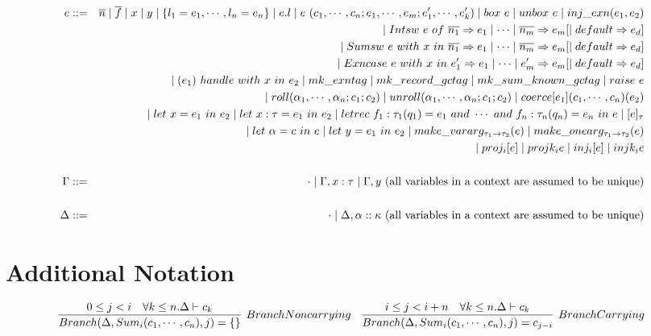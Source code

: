 \documentclass{article}
\begin{document}
\begin{eqnarray*}
	\\
	e &::=& \overline n \mid \overline f \mid x \mid y \mid \{l_1 = e_1,\cdots,l_n = e_n\} \mid e.l \mid e\ (c_1,\cdots,c_n;e_1,\cdots,e_m;e'_1,\cdots,e'_k) \mid box\ e \mid unbox\ e \mid inj\_exn (e_1, e_2) \\
	&& \mid Intsw\ e\ of\ \overline{n_1} \Rightarrow e_1 \mid \cdots \mid \overline{n_m} \Rightarrow e_m [\mid default \Rightarrow e_d] \\
	&& \mid Sumsw\ e\ with\ x\ in\ \overline{n_1} \Rightarrow e_1 \mid \cdots \mid \overline{n_m} \Rightarrow e_m [\mid default \Rightarrow e_d] \\
	&& \mid Exncase\ e\ with\ x\ in\ e'_1 \Rightarrow e_1 \mid \cdots \mid e'_m \Rightarrow e_m [\mid default \Rightarrow e_d] \\
	&& \mid (e_1)\ handle\ with\ x\ in\ e_2 \mid mk\_exntag \mid mk\_record\_gctag \mid mk\_sum\_known\_gctag \mid raise\ e \\
	&& \mid roll(\alpha_1,\cdots,\alpha_n; c_1; c_2) \mid unroll(\alpha_1,\cdots,\alpha_n; c_1; c_2) \mid coerce[e_1](c_1,\cdots,c_n)(e_2) \\
	&& \mid let\ x = e_1\ in\ e_2 \mid let\ x:\tau = e_1\ in\ e_2 \mid letrec\ f_1: \tau_1 (q_1) = e_1 \ and\  \cdots \ and\  f_n: \tau_n (q_n) = e_n\ in\ e \mid [e]_{\tau} \\
	&& \mid let\ \alpha = c\ in\ e \mid let\ y = e_1\ in\ e_2 \mid make\_vararg_{\tau_1 \rightarrow \tau_2}(e) \mid make\_onearg_{\tau_1 \rightarrow \tau_2}(e) \\
	&& \mid proj_{i}[e]\mid projk_{i}e \mid inj_{i}[e]\mid injk_{i}e \\
	\\
	\Gamma &::=& \cdot \mid \Gamma, x: \tau \mid \Gamma, y \textrm{ (all variables in a context are assumed to be unique)} \\
	\\
	\Delta &::=& \cdot \mid \Delta, \alpha:: \kappa \textrm{ (all variables in a context are assumed to be unique)}
\end{eqnarray*}

\section{Additional Notation}

$$
\infer[BranchNoncarrying]{Branch(\Delta, \Sum{i}{c_1,\cdots,c_n}, j) = \Record{}}
{
	0 \leq j < i
	\quad \forall k \leq n . \Delta \vdash c_k
}
\quad
\infer[BranchCarrying]{Branch(\Delta, \Sum{i}{c_1,\cdots,c_n}, j) = c_{j-i}}
{
	i \leq j < i+n
	\quad \forall k \leq n . \Delta \vdash c_k
}
$$
\end{document}
